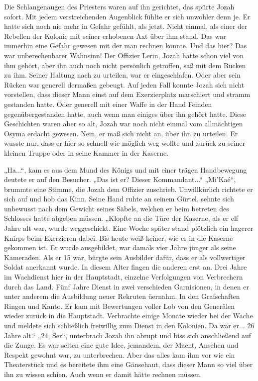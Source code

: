Die Schlangenaugen des Priesters waren auf ihn gerichtet, das spürte Jozah sofort. Mit jedem 
verstreichenden Augenblick fühlte er sich unwohler denn je. Er hatte sich noch nie mehr in Gefahr 
gefühlt, als jetzt. Nicht einmal, als einer der Rebellen der Kolonie mit seiner erhobenen Axt über 
ihm stand. Das war immerhin eine Gefahr gewesen mit der man rechnen konnte. Und das hier? Das war 
unberechenbarer Wahnsinn!
Der Offizier Lerin, Jozah hatte schon viel von ihm gehört, aber ihn auch noch nicht persönlich 
getroffen, saß mit dem Rücken zu ihm. Seiner Haltung nach zu urteilen, war er eingeschlafen. Oder 
aber sein Rücken war generell dermaßen gebeugt. Auf jeden Fall konnte Jozah sich nicht vorstellen, 
dass dieser Mann einst auf dem Exerzierplatz marschiert und stramm gestanden hatte. Oder generell 
mit einer Waffe in der Hand Feinden gegenübergestanden hatte, auch wenn man einiges über ihn gehört 
hatte. Diese Geschichten waren aber so alt, Jozah war noch nicht einmal vom allmächtigen Osyma 
erdacht gewesen. Nein, er maß sich nicht an, über ihn zu urteilen. Er wusste nur, dass er hier so 
schnell wie möglich weg wollte und zurück zu seiner kleinen Truppe oder in seine Kammer in der 
Kaserne.

„Ha...“, kam es aus dem Mund des Königs und mit einer trägen Handbewegung deutete er auf den 
Besucher. „Das ist er? Dieser Kommandant...“
„Mi'Kaé“, brummte eine Stimme, die Jozah dem Offizier zuschrieb. Unwillkürlich richtete er sich auf 
und hob das Kinn. Seine Hand ruhte an seinem Gürtel, sehnte sich unbewusst nach dem Gewicht seines 
Säbels, welchen er beim betreten des Schlosses hatte abgeben müssen.
„Klopfte an die Türe der Kaserne, als er elf Jahre alt war, wurde weggeschickt. Eine Woche später 
stand plötzlich ein hagerer Knirps beim Exerzieren dabei. Bis heute weiß keiner, wie er in die 
Kaserne gekommen ist. Er wurde ausgebildet, war damals vier Jahre jünger als seine Kameraden. Als er 
15 war, bürgte sein Ausbilder dafür, dass er als vollwertiger Soldat anerkannt wurde. In diesem 
Alter fingen die anderen erst an. Drei Jahre im Wachdienst hier in der Hauptstadt, einzelne 
Verfolgungen von Verbrechern durch das Land. Fünf Jahre Dienst in zwei verschieden Garnisionen, in 
denen er unter anderem die Ausbildung neuer Rekruten üernahm. In den Grafschaften Ringen und Kanto. 
Er kam mit Bewertungen voller Lob von den Generälen wieder zurück in die Hauptstadt. Verbrachte 
einige Monate wieder bei der Wache und meldete sich schließlich freiwillig zum Dienst in den 
Kolonien. Da war er... 26 Jahre alt.“
„24, Ser“, unterbrach Jozah ihn abrupt und biss sich anschließend auf die Zunge. Es war selten eine 
gute Idee, jemandem, der Macht, Ansehen und Respekt gewohnt war, zu unterbrechen. Aber das alles kam 
ihm vor wie ein Theaterstück und es bereitete ihm eine Gänsehaut, dass dieser Mann so viel über ihn 
zu wissen schien. Auch wenn er damit hätte rechnen müssen.

